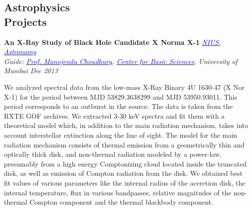 \documentclass[margin,line]{res}
\newenvironment{list1}{
  \begin{list}{\ding{113}}{%
      \setlength{\itemsep}{0in}
      \setlength{\parsep}{0in} \setlength{\parskip}{0in}
      \setlength{\topsep}{0in} \setlength{\partopsep}{0in} 
      \setlength{\leftmargin}{0.17in}}}{\end{list}}
\begin{document}
\begin{resume}
\vspace*{-0.1in}

\section{\sc Astrophysics \\Projects}

{\bf An X-Ray Study of Black Hole Candidate X Norma X-1} \hfill \textit{\href{http://nius.hbcse.tifr.res.in/}{\textcolor{blue} {NIUS, Astronomy}}} \\
{\em Guide: \href{http://cbs.ac.in/people/visiting-scientists/manojendu-choudhury}{\textcolor{blue}{Prof. Manojendu Choudhury}}, \href{http://cbs.ac.in/}{\textcolor{blue} {Center for Basic Sciences}}, University of Mumbai \hfill Dec 2013}
\vspace*{-.15in}
\begin{list1}
\item[] We analyzed spectral data from the low-mass X-Ray Binary 4U 1630-47 (X Nor X-1) for the period between MJD 53829.3638299 and MJD 53950.93011. This period corresponds to an outburst in the source. The data is taken from the RXTE GOF archives. We extracted 3-30 keV spectra and fit them with a theoretical model which, in addition to the main radiation mechanism, takes into account interstellar extinction along the line of sight. The model for the main radiation mechanism consists of thermal emission from a geometrically thin and optically thick disk, and non-thermal radiation modeled by a power-law, presumably from a high energy Comptonizing cloud located inside the truncated disk, as well as emission of Compton radiation from the disk. We obtained best fit values of various parameters like the internal radius of the accretion disk, the internal temperature, flux in various bandpasses, relative magnitudes of the non-thermal Compton component and the thermal blackbody component.
\end{list1}

\vspace*{-0.1in}


\end{resume}
\end{document}
